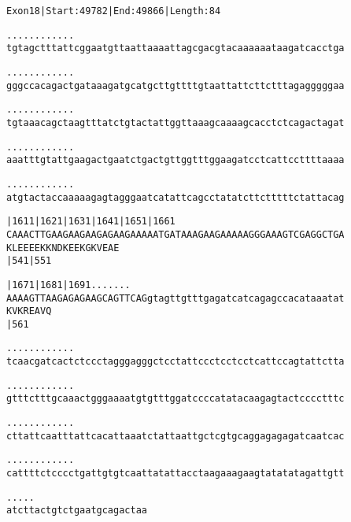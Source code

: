 \documentclass{article}
\begin{document}
\newpage
\begin{alltt}
Exon 18 | Start: 49782 | End: 49866 | Length: 84

.    .    .    .    .    .    .    .    .    .    .    .
tgtagctttattcggaatgttaattaaaattagcgacgtacaaaaaataagatcacctga



.    .    .    .    .    .    .    .    .    .    .    .
gggccacagactgataaagatgcatgcttgttttgtaattattcttctttagagggggaa



.    .    .    .    .    .    .    .    .    .    .    .
tgtaaacagctaagtttatctgtactattggttaaagcaaaagcacctctcagactagat



.    .    .    .    .    .    .    .    .    .    .    .
aaatttgtattgaagactgaatctgactgttggtttggaagatcctcattccttttaaaa



.    .    .    .    .    .    .    .    .    .    .    .
atgtactaccaaaaagagtagggaatcatattcagcctatatcttctttttctattacag



   |1611     |1621     |1631     |1641     |1651     |1661
CAAACTTGAAGAAGAAGAGAAGAAAAATGATAAAGAAGAAAAAGGGAAAGTCGAGGCTGA
 K  L  E  E  E  E  K  K  N  D  K  E  E  K  G  K  V  E  A  E
             |541                          |551

   |1671     |1681     |1691 .    .    .    .    .    .    .
AAAAGTTAAGAGAGAAGCAGTTCAGgtagttgtttgagatcatcagagccacataaatat
 K  V  K  R  E  A  V  Q
             |561

    .    .    .    .    .    .    .    .    .    .    .    .
tcaacgatcactctccctagggagggctcctattccctcctcctcattccagtattctta



\end{alltt}
\newpage
\begin{alltt}
    .    .    .    .    .    .    .    .    .    .    .    .
gtttctttgcaaactgggaaaatgtgtttggatccccatatacaagagtactcccctttc



    .    .    .    .    .    .    .    .    .    .    .    .
cttattcaatttattcacattaaatctattaattgctcgtgcaggagagagatcaatcac



    .    .    .    .    .    .    .    .    .    .    .    .
cattttctcccctgattgtgtcaattatattacctaagaaagaagtatatatagattgtt



    .    .    .    .    .
atcttactgtctgaatgcagactaa


\end{alltt}
\end{document}
